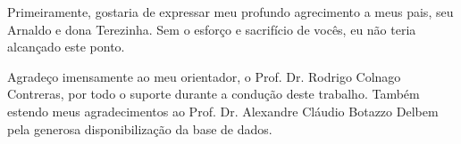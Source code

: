 \begin{agradecimentos}
	Primeiramente, gostaria de expressar meu profundo agrecimento a meus pais, seu Arnaldo e dona Terezinha. Sem o esforço e sacrifício de vocês, eu não teria alcançado este ponto.
	
	Agradeço imensamente ao meu orientador, o Prof. Dr. Rodrigo Colnago Contreras, por todo o suporte durante a condução deste trabalho. Também estendo meus agradecimentos ao Prof. Dr. Alexandre Cláudio Botazzo Delbem pela generosa disponibilização da base de dados.
\end{agradecimentos}
